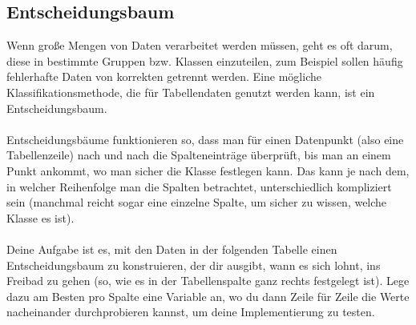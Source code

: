 \subsection{Entscheidungsbaum}
Wenn große Mengen von Daten verarbeitet werden müssen, geht es oft darum, diese in bestimmte Gruppen bzw. Klassen einzuteilen, zum Beispiel sollen häufig fehlerhafte Daten von korrekten getrennt werden. Eine mögliche Klassifikationsmethode, die für Tabellendaten genutzt werden kann, ist ein Entscheidungsbaum.\\
\\
Entscheidungsbäume funktionieren so, dass man für einen Datenpunkt (also eine Tabellenzeile) nach und nach die Spalteneinträge überprüft, bis man an einem Punkt ankommt, wo man sicher die Klasse festlegen kann. Das kann je nach dem, in welcher Reihenfolge man die Spalten betrachtet, unterschiedlich kompliziert sein (manchmal reicht sogar eine einzelne Spalte, um sicher zu wissen, welche Klasse es ist).\\
\\
Deine Aufgabe ist es, mit den Daten in der folgenden Tabelle einen Entscheidungsbaum zu konstruieren, der dir ausgibt, wann es sich lohnt, ins Freibad zu gehen (so, wie es in der Tabellenspalte ganz rechts festgelegt ist). Lege dazu am Besten pro Spalte eine Variable an, wo du dann Zeile für Zeile die Werte nacheinander durchprobieren kannst, um deine Implementierung zu testen.
